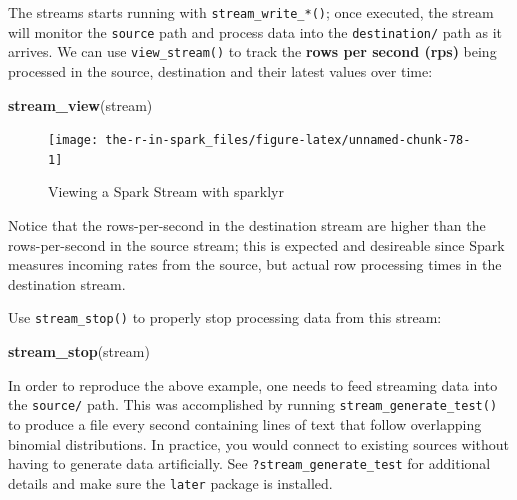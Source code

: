 \documentclass[]{book}
\newenvironment{Shaded}{\begin{snugshade}}{\end{snugshade}}
\newcommand{\DataTypeTok}[1]{\textcolor[rgb]{0.13,0.29,0.53}{#1}}
\newcommand{\KeywordTok}[1]{\textcolor[rgb]{0.13,0.29,0.53}{\textbf{#1}}}
\newcommand{\NormalTok}[1]{#1}
\newcommand{\OperatorTok}[1]{\textcolor[rgb]{0.81,0.36,0.00}{\textbf{#1}}}
\newcommand{\StringTok}[1]{\textcolor[rgb]{0.31,0.60,0.02}{#1}}
\theoremstyle{definition}
\theoremstyle{definition}
\theoremstyle{definition}
\theoremstyle{remark}
\begin{document}
\begin{Shaded}
\end{Shaded}

The streams starts running with \texttt{stream\_write\_*()}; once
executed, the stream will monitor the \texttt{source} path and process
data into the \texttt{destination/} path as it arrives. We can use
\texttt{view\_stream()} to track the \textbf{rows per second (rps)}
being processed in the source, destination and their latest values over
time:

\begin{Shaded}
\begin{Highlighting}[]
\KeywordTok{stream_view}\NormalTok{(stream)}
\end{Highlighting}
\end{Shaded}

\begin{figure}

{\centering \texttt{[image: the-r-in-spark\_files/figure-latex/unnamed-chunk-78-1]} 

}

\caption{Viewing a Spark Stream with sparklyr}\label{fig:unnamed-chunk-78}
\end{figure}

Notice that the rows-per-second in the destination stream are higher
than the rows-per-second in the source stream; this is expected and
desireable since Spark measures incoming rates from the source, but
actual row processing times in the destination stream.

Use \texttt{stream\_stop()} to properly stop processing data from this
stream:

\begin{Shaded}
\begin{Highlighting}[]
\KeywordTok{stream_stop}\NormalTok{(stream)}
\end{Highlighting}
\end{Shaded}

In order to reproduce the above example, one needs to feed streaming
data into the \texttt{source/} path. This was accomplished by running
\texttt{stream\_generate\_test()} to produce a file every second
containing lines of text that follow overlapping binomial distributions.
In practice, you would connect to existing sources without having to
generate data artificially. See \texttt{?stream\_generate\_test} for
additional details and make sure the \texttt{later} package is
installed.
\end{document}
